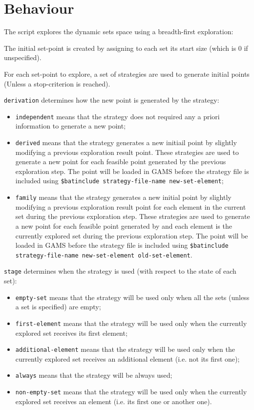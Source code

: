 \section*{Behaviour}

The script explores the dynamic sets space using a breadth-first exploration:

The initial set-point is created by assigning to each set its start size (which
is 0 if unspecified).

For each set-point to explore, a set of strategies are used to generate initial
points (Unless a stop-criterion is reached).

\texttt{derivation} determines how the new point is generated by the strategy:
\begin{itemize}
\item \texttt{independent} means that the strategy does not required any a
  priori information to generate a new point;
\item \texttt{derived} means that the strategy generates a new initiail point by
  slightly modifying a previous exploration result point. These strategies are
  used to generate a new point for each feasible point generated by the previous
  exploration step. The point will be loaded in GAMS before the strategy file is
  included using \texttt{\$batinclude strategy-file-name new-set-element};
\item \texttt{family} means that the strategy generates a new initial point by
  slightly modifying a previous exploration result point for each element in the
  current set during the previous exploration step. These strategies are used to
  generate a new point for each feasible point generated by and each element is
  the currently explored set during the previous exploration step. The point
  will be loaded in GAMS before the strategy file is included using
  \texttt{\$batinclude strategy-file-name new-set-element old-set-element}.
\end{itemize}

\texttt{stage} determines when the strategy is used (with respect to the state
of each set):
\begin{itemize}
\item \texttt{empty-set} means that the strategy will be used only when all the
  sets (unless a set is specified) are empty;
\item \texttt{first-element} means that the strategy will be used only when the
  currently explored set receives its first element;
\item \texttt{additional-element} means that the strategy will be used only when
  the currently explored set receives an additional element (i.e. not its first
  one);
\item \texttt{always} means that the strategy will be always used;
\item \texttt{non-empty-set} means that the strategy will be used only when the
  currently explored set receives an element (i.e. its first one or another
  one).
\end{itemize}

